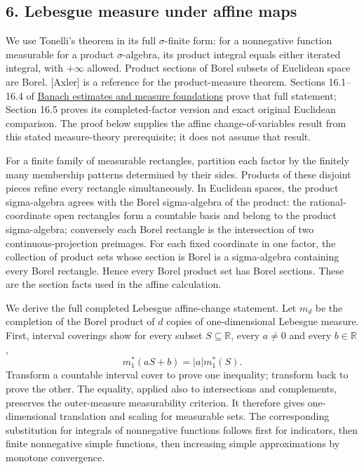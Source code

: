 \documentclass[
  11pt,
]{article}
\begin{document}
\subsection{6. Lebesgue measure under affine
maps}\label{lebesgue-measure-under-affine-maps}

We use Tonelli's theorem in its full \(\sigma\)-finite form: for a
nonnegative function measurable for a product \(\sigma\)-algebra, its
product integral equals either iterated integral, with \(+\infty\)
allowed. Product sections of Borel subsets of Euclidean space are Borel.
{[}Axler{]} is a reference for the product-measure theorem. Sections
16.1--16.4 of \href{banach-foundation-bridges.pdf}{Banach estimates and
measure foundations} prove that full statement; Section 16.5 proves its
completed-factor version and exact original Euclidean comparison. The
proof below supplies the affine change-of-variables result from this
stated measure-theory prerequisite; it does not assume that result.

For a finite family of measurable rectangles, partition each factor by
the finitely many membership patterns determined by their sides.
Products of these disjoint pieces refine every rectangle simultaneously.
In Euclidean spaces, the product sigma-algebra agrees with the Borel
sigma-algebra of the product: the rational-coordinate open rectangles
form a countable basis and belong to the product sigma-algebra;
conversely each Borel rectangle is the intersection of two
continuous-projection preimages. For each fixed coordinate in one
factor, the collection of product sets whose section is Borel is a
sigma-algebra containing every Borel rectangle. Hence every Borel
product set has Borel sections. These are the section facts used in the
affine calculation.

We derive the full completed Lebesgue affine-change statement. Let
\(m_d\) be the completion of the Borel product of \(d\) copies of
one-dimensional Lebesgue measure. First, interval coverings show for
every subset \(S\subseteq\mathbb R\), every \(a\ne0\) and every
\(b\in\mathbb R\), \[
m_1^*(aS+b)=|a|m_1^*(S).
\] Transform a countable interval cover to prove one inequality;
transform back to prove the other. The equality, applied also to
intersections and complements, preserves the outer-measure measurability
criterion. It therefore gives one-dimensional translation and scaling
for measurable sets. The corresponding substitution for integrals of
nonnegative functions follows first for indicators, then finite
nonnegative simple functions, then increasing simple approximations by
monotone convergence.
\end{document}
